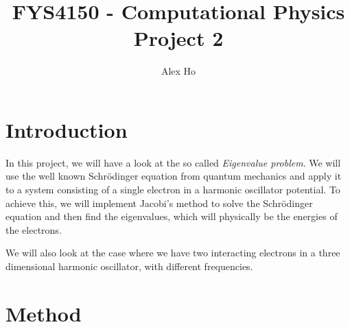 \documentclass[12pt]{article}
\author{Alex Ho}
\title{FYS4150 - Computational Physics \\ Project 2}
\begin{document}
\maketitle
\section{Introduction}
In this project, we will have a look at the so called \textit{Eigenvalue problem}. We will use the well known Schrödinger equation from quantum mechanics and apply it to a system consisting of a single electron in a harmonic oscillator potential. To achieve this, we will implement Jacobi's method to solve the Schrödinger equation and then find the eigenvalues, which will physically be the energies of the electrons.

We will also look at the case where we have two interacting electrons in a three dimensional harmonic oscillator, with different frequencies.
\section{Method}
\end{document}
